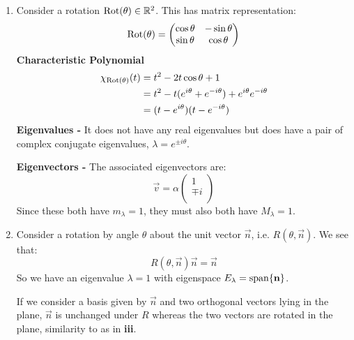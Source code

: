 \documentclass[../main.tex]{subfiles}
\begin{document}
\begin{example}
\begin{enumerate}
    Moreover, any vector $\vec{u}$ on the plane is unchanged, that is, $H \vec{u} = \vec{u}$ for all $\vec{u} \perp \vec{n}$.
    So we also have eigenvalue $\lambda = 1$ with $E_1 = \{\vec{x} : \vec{x} \cdot \vec{n} = \vec{0}\}$.

    Since $m_{-1} = 1$ and $m_1 = 2$, we must have all eigenvalues since we require $m_1 + m_2 \leq M_1 + M_2 \leq 3$.

    Furthermore, since $M_\lambda \geq m_\lambda\ \forall \lambda$, we must have $M_1 = 2$ and $M_1 = 1$ so the geometric and algebraic multiplicities coincide for each eigenvalue.
  \item Consider a rotation $\operatorname{Rot}(\theta) \in \mathbb{R}^2$.
    This has matrix representation:
    \[
      \operatorname{Rot}(\theta) = \begin{pmatrix}
      \cos \theta & -\sin \theta \\
      \sin \theta & \cos \theta \\
      \end{pmatrix}
    \]
    \textbf{Characteristic Polynomial}
    \begin{align*}
      \chi_{\operatorname{Rot}(\theta)}(t) &= t^2 - 2t \cos \theta + 1 \\
                             &= t^2 - t(e^{i\theta} + e^{-i\theta}) + e^{i\theta}e^{-i\theta} \\
                             &= (t - e^{i\theta})(t - e^{-i\theta})
    \end{align*}
    \textbf{Eigenvalues -} It does not have any real eigenvalues but does have a pair of complex conjugate eigenvalues, $\lambda = e^{\pm i\theta}$. \par
    \textbf{Eigenvectors -} The associated eigenvectors are:
    \[
      \vec{v} = \alpha \begin{pmatrix}
      1 \\
      \mp i \\
      \end{pmatrix}
    \]
    Since these both have $m_\lambda = 1$, they must also both have $M_\lambda = 1$.
  \item Consider a rotation by angle $\theta$ about the unit vector $\vec{n}$, i.e. $R(\theta, \vec{n})$.
    We see that:
    \[
      R(\theta, \vec{n})\vec{n} = \vec{n}
    \]
    So we have an eigenvalue $\lambda = 1$ with eigenspace $E_\lambda = \operatorname{span}\{\mathbf{\bm{n}}\}$.

    If we consider a basis given by $\vec{n}$ and two orthogonal vectors lying in the plane, $\vec{n}$ is unchanged under $R$ whereas the two vectors are rotated in the plane, similarity to as in \textbf{iii}.


\end{enumerate}
\end{example}
\end{document}
